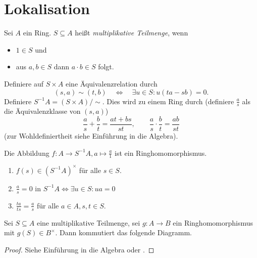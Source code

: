 \documentclass[12pt,a4paper]{scrartcl}
\theoremstyle{cplain}
\theoremstyle{cdef}
\begin{document}

\section{Lokalisation}
\begin{defi}
	Sei $A$ ein Ring. $S\subseteq A$ heißt \emph{multiplikative Teilmenge}, wenn
	\begin{itemize}
		\item $1\in S$ und
		\item aus $a,b\in S$ dann $a\cdot b \in S$ folgt.
	\end{itemize}
	Definiere auf $S\times A$ eine Äquivalenzrelation durch
	\[(s,a) \sim (t,b) \quad \Longleftrightarrow \quad \exists u\in S: u(ta-sb) = 0.\]
	Definiere $S^{-1}A = (S\times A)/\sim$. Dies wird zu einem Ring durch (definiere $\frac as$ als die Äquivalenzklasse von $(s,a)$)
	\[\frac as+\frac bt = \frac {at+bs}{st},\qquad \frac as\cdot \frac bt = \frac{ab}{st}\]
	(zur Wohldefiniertheit siehe Einführung in die Algebra).
	
	Die Abbildung $f\colon A\to S^{-1}A, a\mapsto \frac a1$ ist ein Ringhomomorphismus.
\end{defi}
\begin{bem}
	\leavevmode
	\begin{enumerate}
		\item $f(s)\in (S^{-1}A)^{\times}$ für alle $s\in S$.
		\item $\frac as = 0$ in $S^{-1}A\Leftrightarrow \exists u\in S: ua = 0$
		\item $\frac{ta}{ts} = \frac as$ für alle $a\in A, s,t\in S$.
	\end{enumerate}
\end{bem}
\begin{satz}
	Sei $S\subseteq A$ eine multiplikative Teilmenge, sei $g\colon A\to B$ ein Ringhomomorphismus mit $g(S) \in B^{\times}$. Dann kommutiert das folgende Diagramm.
	\begin{center}
	\end{center}
\end{satz}
\begin{proof}
	Siehe Einführung in die Algebra oder \cite[Proposition 3.1]{atiyah-macdonald}.
\end{proof}
\end{document}
